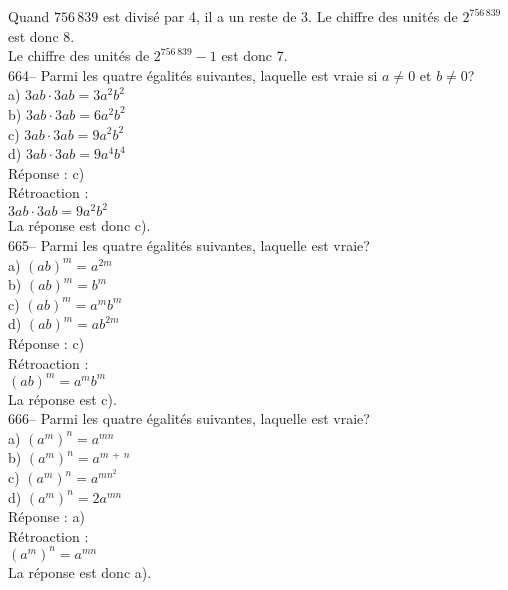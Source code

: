 ﻿\documentclass[letterpaper, 12pt]{article}
\begin{document}
Quand $756\,839$ est divis\'e par 4, il a un reste de 3.  Le chiffre des
unit\'es de $2^{756\,839}$ est donc 8.\\
Le chiffre des unit\'es de $2^{756\,839}-1$ est donc 7.  \\

664-- Parmi les quatre \'egalit\'es suivantes, laquelle est vraie si
$a\neq0$ et $b \neq 0$?\\
a) $3ab\cdot3ab=3a^{2}b^{2}$\\
b) $3ab\cdot3ab=6a^{2}b^{2}$\\
c) $3ab\cdot3ab=9a^{2}b^{2}$\\
d) $3ab\cdot3ab= 9a^{4}b^{4}$\\

R\'eponse : c)\\

R\'etroaction : \\
$3ab\cdot3ab=9a^{2}b^{2}$\\
La r\'eponse est donc c).\\

665-- Parmi les quatre \'egalit\'es suivantes, laquelle est vraie?\\
a) $\left( ab\right) ^m=a^{2m}$\\
b) $\left( ab\right) ^m=b^{m}$\\
c) $\left( ab\right) ^m=a^{m}b^{m}$\\
d) $\left( ab\right) ^m=ab^{2m}$\\

R\'eponse : c)\\

R\'etroaction : \\
$\left( ab\right) ^m=a^{m}b^{m}$\\
La r\'eponse est c).\\

666-- Parmi les quatre \'egalit\'es suivantes, laquelle est vraie?\\
a) $\left( a^{m}\right)^{n}=a^{mn}$ \\
b) $\left( a^{m}\right)^{n}=a^{m\,+\,n}$ \\
c) $\left( a^{m}\right)^{n}=a^{mn^{2}}$ \\
d) $\left( a^{m}\right)^{n}=2a^{mn}$ \\

R\'eponse : a)\\

R\'etroaction : \\
$\left( a^{m}\right)^{n}=a^{mn}$ \\
La r\'eponse est donc a).\\
\end{document}

